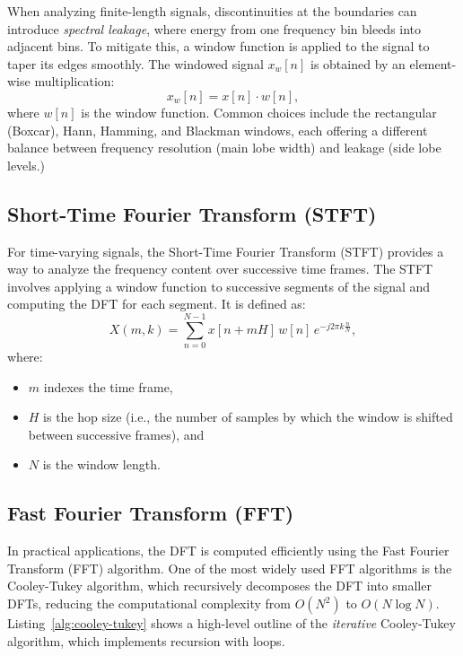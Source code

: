 \documentclass[12pt,letter]{article}
\begin{document}
When analyzing finite-length signals, discontinuities at the boundaries can
introduce \textit{spectral leakage}, where energy from one frequency bin
bleeds into adjacent bins. To mitigate this, a window function is applied to
the signal to taper its edges smoothly. The windowed signal $x_w[n]$ is
obtained by an element-wise multiplication:
\begin{equation}
x_w[n] = x[n] \cdot w[n],
\label{eqn:window}
\end{equation}
where $w[n]$ is the window function. Common choices include the rectangular
(Boxcar), Hann, Hamming, and Blackman windows, each offering a different
balance between frequency resolution (main lobe width) and leakage (side
lobe levels.)

\subsection{Short-Time Fourier Transform (STFT)}

For time-varying signals, the Short-Time Fourier Transform (STFT) provides a
way to analyze the frequency content over successive time frames. The STFT
involves applying a window function to successive segments of the signal and
computing the DFT for each segment. It is defined as:
\begin{equation}
X(m, k) = \sum_{n=0}^{N-1} x[n + mH] \, w[n] \, e^{-j2\pi k \frac{n}{N}},
\label{eqn:stft}
\end{equation}
where:
\begin{itemize}
  \item $m$ indexes the time frame,
  \item $H$ is the hop size (i.e., the number of samples by which the window
  is shifted between successive frames), and
  \item $N$ is the window length.
\end{itemize}

\subsection{Fast Fourier Transform (FFT)}

In practical applications, the DFT is computed efficiently using the Fast
Fourier Transform (FFT) algorithm. One of the most widely used FFT algorithms
is the Cooley-Tukey algorithm, which recursively decomposes the DFT into
smaller DFTs, reducing the computational complexity from $O(N^2)$ to
$O(N \log N)$. Listing~\ref{alg:cooley-tukey} shows a high-level outline of
the \textit{iterative} Cooley-Tukey algorithm, which implements recursion
with loops.
\end{document}
